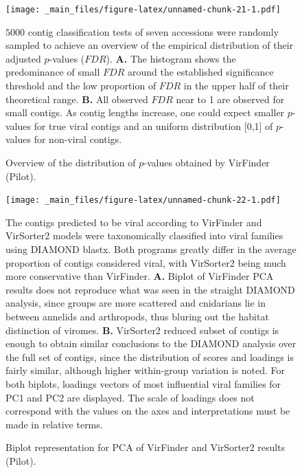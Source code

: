 \documentclass[
  openany]{book}
\begin{document}
\begin{figure}[!htbp]

\texttt{[image: \_main\_files/figure-latex/unnamed-chunk-21-1.pdf]}

\caption{Overview of the distribution of $p$-values obtained by VirFinder (Pilot).\label{fig:vfpvals}}
$5000$ contig classification tests of seven accessions were randomly sampled to achieve an overview of the empirical distribution of their adjusted $p$-values ($FDR$). \textbf{A.} The histogram shows the predominance of small $FDR$ around the established significance threshold and the low proportion of $FDR$ in the upper half of their theoretical range. \textbf{B.} All observed $FDR$ near to 1 are observed for small contigs. As contig lengths increase, one could expect smaller $p$-values for true viral contigs and an uniform distribution [0,1] of $p$-values for non-viral contigs. 

\end{figure}

\begin{figure}[!htbp]

\texttt{[image: \_main\_files/figure-latex/unnamed-chunk-22-1.pdf]}

\caption{Biplot representation for PCA of VirFinder and VirSorter2 results (Pilot).\label{fig:sample50pcavfvs2}}
The contigs predicted to be viral according to VirFinder and VirSorter2 models were taxonomically classified into viral families using DIAMOND blastx. Both programs greatly differ in the average proportion of contigs considered viral, with VirSorter2 being much more conservative than VirFinder. \textbf{A.} Biplot of VirFinder PCA results does not reproduce what was seen in the straight DIAMOND analysis, since groups are more scattered and cnidarians lie in between annelids and arthropods, thus bluring out the habitat distinction of viromes. \textbf{B.} VirSorter2 reduced subset of contigs is enough to obtain similar conclusions to the DIAMOND analysis over the full set of contigs, since the distribution of scores and loadings is fairly similar, although higher within-group variation is noted. For both biplots, loadings vectors of most influential viral families for PC1 and PC2 are displayed. The scale of loadings does not correspond with the values on the axes and interpretations must be made in relative terms.
\end{figure}
\end{document}
